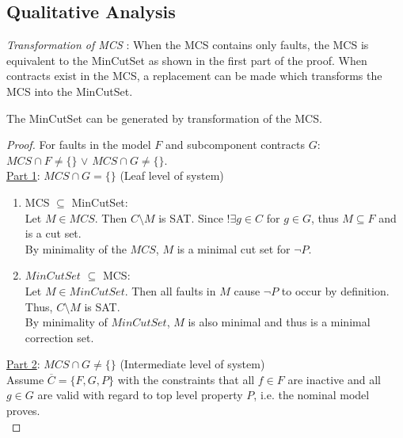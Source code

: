 \subsection{Qualitative Analysis}

\textit{Transformation of MCS} : When the MCS contains only faults, the MCS is equivalent to the MinCutSet as shown in the first part of the proof. When contracts exist in the MCS, a replacement can be made which transforms the MCS into the MinCutSet. \\

\begin{theorem}  The MinCutSet can be generated by transformation of the MCS.\\

\begin{proof}  For faults in the model $F$ and subcomponent contracts $G$:\\ $MCS \cap F \neq \{\}$ $\lor$ $MCS \cap G \neq \{\}$.\\

\underline{Part 1}: $MCS \cap G = \{\}$ (Leaf level of system)\\
\begin{enumerate}[label=(\roman*)]

\item MCS $\subseteq$ MinCutSet: \\

Let $M \in  MCS$. Then $C\setminus M$ is SAT. Since $!\exists g \in C$ for $g \in G$, thus $M \subseteq F$ and is a cut set.  \\

By minimality of the $MCS$, $M$ is a minimal cut set for $ \neg P $.  \\

\item $MinCutSet $ $\subseteq$ MCS: \\

Let $M \in MinCutSet$. Then all faults in $M$ cause $ \neg P $ to occur by definition. Thus, $C\setminus M$ is SAT.  \\

By minimality of $MinCutSet$, $M$ is also minimal and thus is a minimal correction set.\\

\end{enumerate}

\underline{Part 2}: $MCS \cap G \neq \{\}$ (Intermediate level of system)\\

Assume $\overline{C} = \{F,G,P\}$ with the constraints that all $f \in F$ are inactive and all $g\in G$ are valid with regard to top level property $P$, i.e. the nominal model proves. \\


\end{proof}
\end{theorem}
